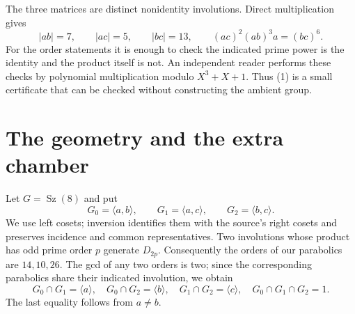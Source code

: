 \documentclass[11pt,a4paper]{article}
\newcommand{\gen}[1]{\langle#1\rangle}
\newcommand{\Sz}{\operatorname{Sz}}
\begin{document}
The three matrices are distinct nonidentity involutions. Direct multiplication
gives
\[
 |ab|=7,\qquad |ac|=5,\qquad |bc|=13,\qquad
 (ac)^2(ab)^3a=(bc)^6.                                      \tag{1}
\]
For the order statements it is enough to check the indicated prime power
is the identity and the product itself is not. An independent reader
performs these checks by polynomial multiplication modulo $X^3+X+1$.
Thus (1) is a small certificate that can be checked without constructing
the ambient group.

\section{The geometry and the extra chamber}
Let $G=\Sz(8)$ and put
\[
 G_0=\gen{a,b},\qquad G_1=\gen{a,c},\qquad G_2=\gen{b,c}.
\]
We use left cosets; inversion identifies them with the source's right
cosets and preserves incidence and common representatives.
Two involutions whose product has odd prime order $p$ generate $D_{2p}$.
Consequently the orders of our parabolics are $14,10,26$. The gcd of
any two orders is two; since the corresponding parabolics share their
indicated involution, we obtain
\[
 G_0\cap G_1=\gen a,\quad G_0\cap G_2=\gen b,\quad
 G_1\cap G_2=\gen c,\quad G_0\cap G_1\cap G_2=1.           \tag{2}
\]
The last equality follows from $a\ne b$.
\end{document}
